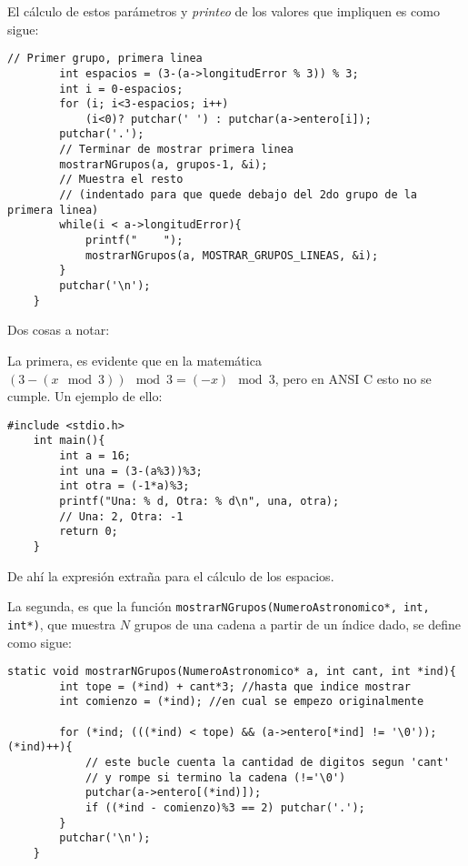 \documentclass[a4paper, 12pt]{article}
\begin{document}
El cálculo de estos parámetros y \emph{printeo} de los valores que impliquen es como sigue:

\begin{lstlisting}[style=C]
        // Primer grupo, primera linea
        int espacios = (3-(a->longitudError % 3)) % 3;
        int i = 0-espacios;
        for (i; i<3-espacios; i++) 
            (i<0)? putchar(' ') : putchar(a->entero[i]);
        putchar('.');
        // Terminar de mostrar primera linea
        mostrarNGrupos(a, grupos-1, &i);
        // Muestra el resto
        // (indentado para que quede debajo del 2do grupo de la primera linea)
        while(i < a->longitudError){
            printf("    ");
            mostrarNGrupos(a, MOSTRAR_GRUPOS_LINEAS, &i);
        }
        putchar('\n');
    }
\end{lstlisting}

Dos cosas a notar:

La primera, es evidente que en la matemática $(3-(x\mod3))\mod3 = (-x)\mod3$, pero en ANSI C esto no se cumple. Un ejemplo de ello:

\begin{lstlisting}[style=C]
    #include <stdio.h>
    int main(){
        int a = 16;
        int una = (3-(a%3))%3;
        int otra = (-1*a)%3;
        printf("Una: % d, Otra: % d\n", una, otra);
        // Una: 2, Otra: -1
        return 0;
    }
\end{lstlisting}

De ahí la expresión extraña para el cálculo de los espacios.

La segunda, es que la función \texttt{mostrarNGrupos(NumeroAstronomico*, int, int*)}, que muestra $N$ grupos de una cadena a partir de un índice dado, se define como sigue:

\begin{lstlisting}[style=C]
    static void mostrarNGrupos(NumeroAstronomico* a, int cant, int *ind){
        int tope = (*ind) + cant*3; //hasta que indice mostrar
        int comienzo = (*ind); //en cual se empezo originalmente
    
        for (*ind; (((*ind) < tope) && (a->entero[*ind] != '\0')); (*ind)++){
            // este bucle cuenta la cantidad de digitos segun 'cant'
            // y rompe si termino la cadena (!='\0')
            putchar(a->entero[(*ind)]);
            if ((*ind - comienzo)%3 == 2) putchar('.');
        }
        putchar('\n');
    }
\end{lstlisting}
\end{document}
